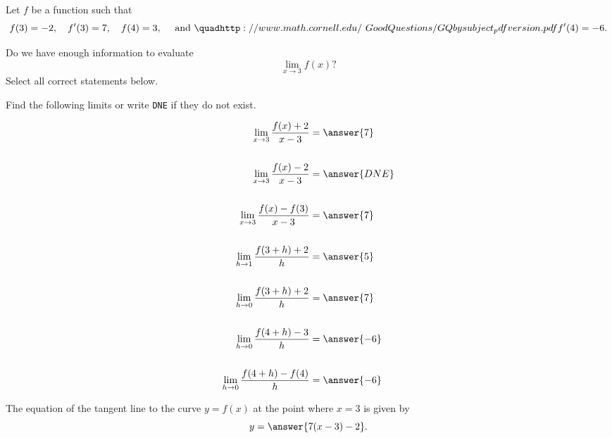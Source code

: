 \documentclass{ximera}
\author{Nela Lakos \and Kyle Parsons}
\begin{document}
\begin{exercise}

Let $f$ be a function such that 
\[
f(3)=-2,\quad f'(3)=7,\quad f(4)=3, \quad \text{ and  } \quadhttp://www.math.cornell.edu/~GoodQuestions/GQbysubject_pdfversion.pdf f'(4)=-6.
\]

Do we have enough information to evaluate
\[
\lim_{x\to3}f(x)?
\]
Select all correct statements below.

\begin{selectAll}
\end{selectAll}

\begin{exercise}

Find the following limits or write \verb|DNE| if they do not exist.

\begin{align*}
\lim_{x\to3}\frac{f(x) + 2}{x - 3} &= \answer{7}\\ \\
\lim_{x\to3}\frac{f(x) - 2}{x - 3} &= \answer{DNE}\\ \\
\lim_{x\to3}\frac{f(x) - f(3)}{x-3} &= \answer{7}\\ \\
\lim_{h\to1}\frac{f(3+h) + 2}{h} &= \answer{5}\\ \\
\lim_{h\to0}\frac{f(3+h) + 2}{h} &= \answer{7}\\ \\
\lim_{h\to0}\frac{f(4+h) - 3}{h} &= \answer{-6}\\ \\
\lim_{h\to0}\frac{f(4+h) - f(4)}{h} &= \answer{-6}
\end{align*}

\begin{exercise}

The equation of the tangent line to the curve $y = f(x)$ at the point where $x = 3$ is given by
\[
y = \answer{7(x-3) - 2}.
\]

\end{exercise}
\end{exercise}
\end{exercise}
\end{document}

